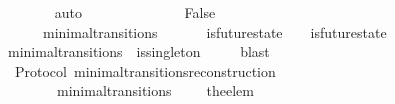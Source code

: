 \begin{isabellebody}
\ \ \ \ \ \ \isamarkupfalse%
\ auto\ \ \ \ \ \ \isanewline
\ \ \isamarkupfalse%
\isanewline
\ \ \isamarkupfalse%
\ \isamarkupfalse%
\ False\isanewline
\ \ \ \ \isamarkupfalse%
\ {\isacartoucheopen}{\isasymforall}{\isasymsigma}\ {\isasymsigma}{\isacharprime}{\isachardot}\ {\isacharparenleft}{\isasymsigma}{\isacharcomma}\ {\isasymsigma}{\isacharprime}{\isacharparenright}\ {\isasymin}\ minimal{\isacharunderscore}transitions\ {\isasymlongrightarrow}\ {\isacharparenleft}{\isasymnexists}{\isasymsigma}{\isacharprime}{\isacharprime}{\isachardot}\ {\isasymsigma}{\isacharprime}{\isacharprime}\ {\isasymin}\ {\isasymSigma}\ {\isasymand}\ is{\isacharunderscore}future{\isacharunderscore}state\ {\isacharparenleft}{\isasymsigma}{\isacharcomma}\ {\isasymsigma}{\isacharprime}{\isacharprime}{\isacharparenright}\ {\isasymand}\ is{\isacharunderscore}future{\isacharunderscore}state\ {\isacharparenleft}{\isasymsigma}{\isacharprime}{\isacharprime}{\isacharcomma}\ {\isasymsigma}{\isacharprime}{\isacharparenright}\ {\isasymand}\ {\isasymsigma}\ {\isasymnoteq}\ {\isasymsigma}{\isacharprime}{\isacharprime}\ {\isasymand}\ {\isasymsigma}{\isacharprime}{\isacharprime}\ {\isasymnoteq}\ {\isasymsigma}{\isacharprime}{\isacharparenright}{\isacartoucheclose}\ {\isacartoucheopen}{\isasymnot}\ {\isacharparenleft}{\isasymforall}{\isasymsigma}\ {\isasymsigma}{\isacharprime}{\isachardot}\ {\isacharparenleft}{\isasymsigma}{\isacharcomma}\ {\isasymsigma}{\isacharprime}{\isacharparenright}\ {\isasymin}\ minimal{\isacharunderscore}transitions\ {\isasymlongrightarrow}\ is{\isacharunderscore}singleton\ {\isacharparenleft}{\isasymsigma}{\isacharprime}\ {\isacharminus}\ {\isasymsigma}{\isacharparenright}{\isacharparenright}{\isacartoucheclose}\ \isamarkupfalse%
\ blast\isanewline
{}\isamarkupfalse%
%
\endisatagproof
{\isafoldproof}%
%
\isadelimproof
\isanewline
%
\endisadelimproof
\isanewline
{}\isamarkupfalse%
\ {\isacharparenleft}\ Protocol{\isacharparenright}\ minimal{\isacharunderscore}transitions{\isacharunderscore}reconstruction\ {\isacharcolon}\isanewline
\ \ {\isachardoublequoteopen}{\isasymforall}\ {\isasymsigma}\ {\isasymsigma}{\isacharprime}{\isachardot}\ {\isacharparenleft}{\isasymsigma}{\isacharcomma}\ {\isasymsigma}{\isacharprime}{\isacharparenright}\ {\isasymin}\ minimal{\isacharunderscore}transitions\ \ {\isasymlongrightarrow}\ {\isasymsigma}\ {\isasymunion}\ {\isacharbraceleft}the{\isacharunderscore}elem\ {\isacharparenleft}{\isasymsigma}{\isacharprime}{\isacharminus}\ {\isasymsigma}{\isacharparenright}{\isacharbraceright}\ {\isacharequal}\ {\isasymsigma}{\isacharprime}{\isachardoublequoteclose}\isanewline

\end{isabellebody}

